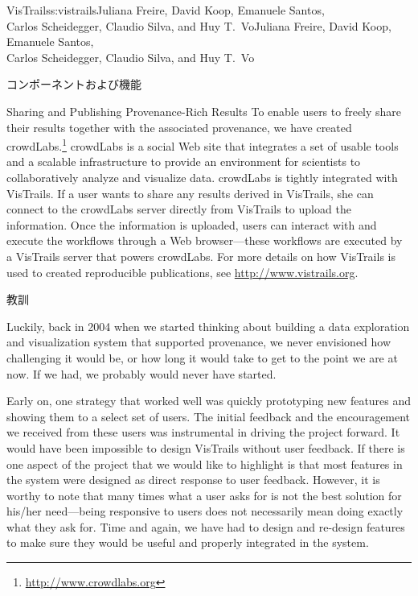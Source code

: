 \begin{aosachaptertoc}{VisTrails}{s:vistrails}{Juliana Freire, David Koop, Emanuele Santos, \\ Carlos Scheidegger, Claudio Silva, and Huy T.\ Vo}{Juliana Freire, David Koop, Emanuele Santos, \\ \hspace*{0.9cm} Carlos Scheidegger, Claudio Silva, and Huy T.\ Vo}
\begin{aosasect1}{コンポーネントおよび機能}
\begin{aosasect2}{Sharing and Publishing Provenance-Rich Results}
To enable users to freely share their results together with the
associated provenance, we have created
crowdLabs.\footnote{\url{http://www.crowdlabs.org}} crowdLabs is a
social Web site that integrates a set of usable tools and a scalable
infrastructure to provide an environment for scientists to
collaboratively analyze and visualize data.  crowdLabs is tightly
integrated with VisTrails. If a user wants to share any results
derived in VisTrails, she can connect to the crowdLabs server directly
from VisTrails to upload the information. Once the information is
uploaded, users can interact with and execute the workflows through a
Web browser---these workflows are executed by a VisTrails server that
powers crowdLabs. For more details on how VisTrails is used to created reproducible publications, see \url{http://www.vistrails.org}.

\end{aosasect2}

\end{aosasect1}

\begin{aosasect1}{教訓}

Luckily, back in 2004 when we started thinking about building a data
exploration and visualization system that supported provenance, we
never envisioned how challenging it would be, or how long it would
take to get to the point we are at now. If we had, we probably would
never have started.

Early on, one strategy that worked well was quickly prototyping new
features and showing them to a select set of users. The initial
feedback and the encouragement we received from these users was
instrumental in driving the project forward. It would have been
impossible to design VisTrails without user feedback. If there is one
aspect of the project that we would like to highlight is that most
features in the system were designed as direct response to user
feedback. However, it is worthy to note that many times what a user
asks for is not the best solution for his/her need---being responsive
to users does not necessarily mean doing exactly what they ask for.
Time and again, we have had to design and re-design features to make
sure they would be useful and properly integrated in the system.


\end{aosasect1}
\end{aosachaptertoc}
